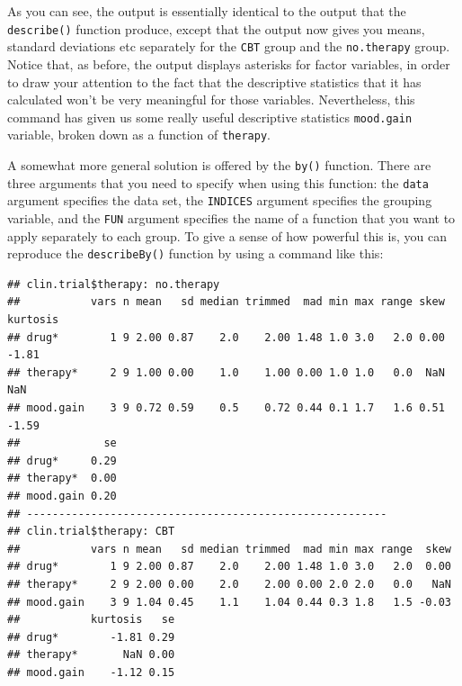 \documentclass[
]{book}
\newenvironment{Shaded}{\begin{snugshade}}{\end{snugshade}}
\newcommand{\AttributeTok}[1]{\textcolor[rgb]{0.77,0.63,0.00}{#1}}
\newcommand{\FunctionTok}[1]{\textcolor[rgb]{0.00,0.00,0.00}{#1}}
\newcommand{\NormalTok}[1]{#1}
\newcommand{\SpecialCharTok}[1]{\textcolor[rgb]{0.00,0.00,0.00}{#1}}
\begin{document}
As you can see, the output is essentially identical to the output that the \texttt{describe()} function produce, except that the output now gives you means, standard deviations etc separately for the \texttt{CBT} group and the \texttt{no.therapy} group. Notice that, as before, the output displays asterisks for factor variables, in order to draw your attention to the fact that the descriptive statistics that it has calculated won't be very meaningful for those variables. Nevertheless, this command has given us some really useful descriptive statistics \texttt{mood.gain} variable, broken down as a function of \texttt{therapy}.

A somewhat more general solution is offered by the \texttt{by()} function. There are three arguments that you need to specify when using this function: the \texttt{data} argument specifies the data set, the \texttt{INDICES} argument specifies the grouping variable, and the \texttt{FUN} argument specifies the name of a function that you want to apply separately to each group. To give a sense of how powerful this is, you can reproduce the \texttt{describeBy()} function by using a command like this:

\begin{Shaded}
\end{Shaded}

\begin{verbatim}
## clin.trial$therapy: no.therapy
##           vars n mean   sd median trimmed  mad min max range skew kurtosis
## drug*        1 9 2.00 0.87    2.0    2.00 1.48 1.0 3.0   2.0 0.00    -1.81
## therapy*     2 9 1.00 0.00    1.0    1.00 0.00 1.0 1.0   0.0  NaN      NaN
## mood.gain    3 9 0.72 0.59    0.5    0.72 0.44 0.1 1.7   1.6 0.51    -1.59
##             se
## drug*     0.29
## therapy*  0.00
## mood.gain 0.20
## -------------------------------------------------------- 
## clin.trial$therapy: CBT
##           vars n mean   sd median trimmed  mad min max range  skew
## drug*        1 9 2.00 0.87    2.0    2.00 1.48 1.0 3.0   2.0  0.00
## therapy*     2 9 2.00 0.00    2.0    2.00 0.00 2.0 2.0   0.0   NaN
## mood.gain    3 9 1.04 0.45    1.1    1.04 0.44 0.3 1.8   1.5 -0.03
##           kurtosis   se
## drug*        -1.81 0.29
## therapy*       NaN 0.00
## mood.gain    -1.12 0.15
\end{verbatim}
\end{document}
